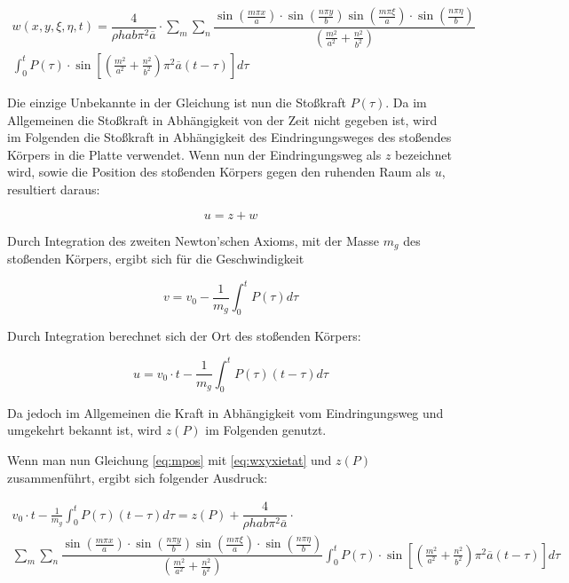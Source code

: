 \begin{multline}
	w(x,y,\xi, \eta, t) = \dfrac{4}{\rho h a b \pi^2 \overline{a}} \cdot \sum_m \sum_n 
	\dfrac{\sin\left(\frac{m \pi x}{a}\right) \cdot \sin\left(\frac{n \pi y}{b}\right) \sin\left(\frac{m \pi \xi}{a}\right) \cdot \sin\left(\frac{n \pi \eta}{b}\right)	}{\left(\frac{m^2}{a^2} + \frac{n^2}{b^2} \right)}  \\
	\int_0^t
	P(\tau)\cdot \sin \left[ \left(\frac{m^2}{a^2} + \frac{n^2}{b^2} \right) \pi^2 \overline{a} (t-\tau)\right] d\tau
	\label{eq:wxyxietat}
\end{multline}


Die einzige Unbekannte in der Gleichung ist nun die Stoßkraft $P(\tau)$. Da im Allgemeinen die Stoßkraft in Abhängigkeit von der Zeit nicht gegeben ist, wird im Folgenden die Stoßkraft in Abhängigkeit des Eindringungsweges des stoßendes Körpers in die Platte verwendet. Wenn nun der Eindringungsweg als $z$ bezeichnet wird, sowie die Position des stoßenden Körpers gegen den ruhenden Raum als $u$, resultiert daraus:

\begin{equation}
	u = z + w
\end{equation}


Durch Integration des zweiten Newton'schen Axioms, mit der Masse $m_g$ des stoßenden Körpers, ergibt sich für die Geschwindigkeit 

\begin{equation}
	v = v_0 - \frac{1}{m_g} \int_0^t P(\tau) d\tau
	\label{eq:speedEq}
\end{equation}

Durch Integration berechnet sich der Ort des stoßenden Körpers:

\begin{equation}
	u = v_0 \cdot t - \frac{1}{m_g} \int_0^t P(\tau) (t-\tau) d\tau
	\label{eq:mpos}
\end{equation}


Da jedoch im Allgemeinen die Kraft in Abhängigkeit vom Eindringungsweg und umgekehrt bekannt ist, wird $z(P)$ im Folgenden genutzt.

\newpage

Wenn man nun Gleichung \ref{eq:mpos} mit \ref{eq:wxyxietat} und $z(P)$ zusammenführt, ergibt sich folgender Ausdruck:


\begin{multline}
v_0 \cdot t - \frac{1}{m_g} \int_0^t P(\tau) (t-\tau) d\tau = z(P) + \dfrac{4}{\rho h a b \pi^2 \overline{a}} \cdot  \\  \sum_m \sum_n 
\dfrac{{\sin\left(\frac{m \pi x}{a}\right) \cdot \sin\left(\frac{n \pi y}{b}\right) \sin\left(\frac{m \pi \xi}{a}\right) \cdot \sin\left(\frac{n \pi \eta}{b}\right)	}}{\left(\frac{m^2}{a^2} + \frac{n^2}{b^2} \right)} 
\int_0^t
P(\tau)\cdot \sin \left[ \left(\frac{m^2}{a^2} + \frac{n^2}{b^2} \right) \pi^2 \overline{a} (t-\tau)\right] d\tau
\label{eq:long_solution}
\end{multline}

